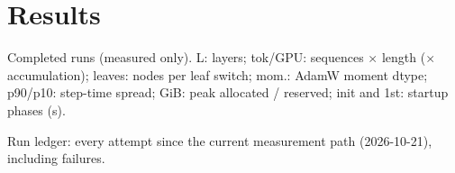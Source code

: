 \section{Results}
\label{app:results}

\begin{table}[h]
  \caption{Completed runs (measured only). L: layers; tok/GPU: sequences $\times$ length ($\times$
    accumulation); leaves: nodes per leaf switch; mom.: AdamW moment dtype; p90/p10: step-time spread;
    GiB: peak allocated / reserved; init and 1st: startup phases (s).}
  \label{tab:results}
  \centering
  \begin{adjustbox}{max width=\linewidth}
    
  \end{adjustbox}
\end{table}

\begin{table}[h]
  \caption{Run ledger: every attempt since the current measurement path (2026-10-21), including failures.}
  \label{tab:ledger}
  \centering
  \begin{adjustbox}{max width=\linewidth}
    
  \end{adjustbox}
\end{table}
